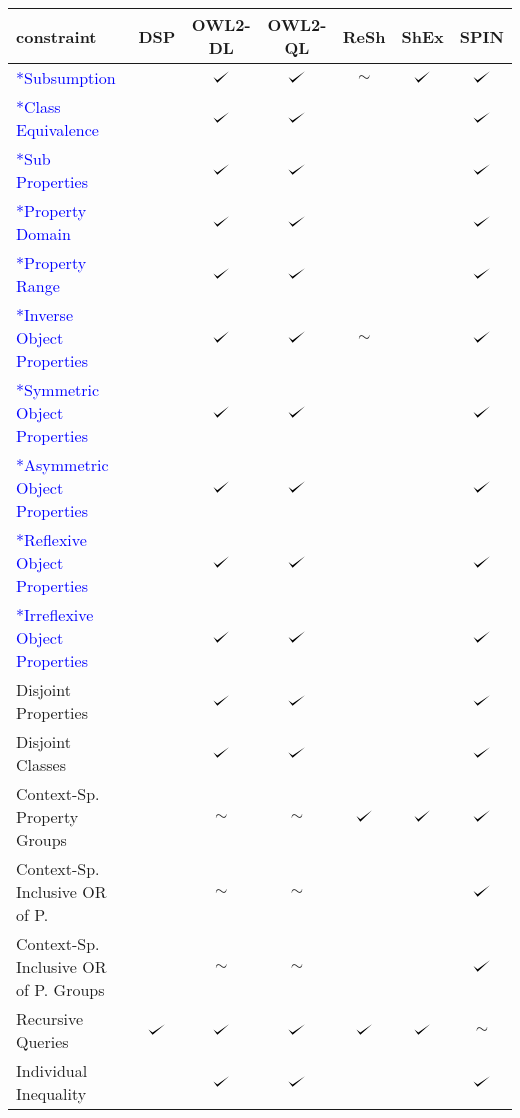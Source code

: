 \documentclass{llncs}
\def\checkmark{\tikz\fill[scale=0.4](0,.35) -- (.25,0) -- (1,.7) -- (.25,.15) -- cycle;}
\newenvironment{evaluation}{
  \scriptsize
  \sffamily
  \vspace{0.3cm}
  \begin{tabular}{l|c|c|c|c|c|c}
  \hline
  \textbf{constraint} & \textbf{DSP} & \textbf{OWL2-DL} & \textbf{OWL2-QL} & \textbf{ReSh} & \textbf{ShEx} & \textbf{SPIN} \\
  \hline

}{
  \hline
  \end{tabular}
  \linebreak
}
\begin{document}
\begin{evaluation}
\textcolor{blue}{*Subsumption} & \ding{55} & $\checkmark$ & $\checkmark$ & $\sim$ & $\checkmark$ & $\checkmark$ \\
\textcolor{blue}{*Class Equivalence} & \ding{55} & $\checkmark$ & $\checkmark$ & \ding{55} & \ding{55} & $\checkmark$ \\
\textcolor{blue}{*Sub Properties} & \ding{55} & $\checkmark$ & $\checkmark$ & \ding{55} & \ding{55} & $\checkmark$ \\
\textcolor{blue}{*Property Domain} & \ding{55} & $\checkmark$ & $\checkmark$ & \ding{55} & \ding{55} & $\checkmark$ \\
\textcolor{blue}{*Property Range} & \ding{55} & $\checkmark$ & $\checkmark$ & \ding{55} & \ding{55} & $\checkmark$ \\
\textcolor{blue}{*Inverse Object Properties} & \ding{55} & $\checkmark$ & $\checkmark$ & $\sim$ & \ding{55} & $\checkmark$ \\
\textcolor{blue}{*Symmetric Object Properties} & \ding{55} & $\checkmark$ & $\checkmark$ & \ding{55} & \ding{55} & $\checkmark$ \\
\textcolor{blue}{*Asymmetric Object Properties} & \ding{55} & $\checkmark$ & $\checkmark$ & \ding{55} & \ding{55} & $\checkmark$ \\
\textcolor{blue}{*Reflexive Object Properties} & \ding{55} & $\checkmark$ & $\checkmark$ & \ding{55} & \ding{55} & $\checkmark$ \\
\textcolor{blue}{*Irreflexive Object Properties} & \ding{55} & $\checkmark$ & $\checkmark$ & \ding{55} & \ding{55} & $\checkmark$ \\
Disjoint Properties & \ding{55} & $\checkmark$ & $\checkmark$ & \ding{55} & \ding{55} & $\checkmark$ \\
Disjoint Classes & \ding{55} & $\checkmark$ & $\checkmark$ & \ding{55} & \ding{55} & $\checkmark$ \\
Context-Sp. Property Groups & \ding{55} & $\sim$ & $\sim$ & $\checkmark$ & $\checkmark$ & $\checkmark$ \\
Context-Sp. Inclusive OR of P. & \ding{55} & $\sim$ & $\sim$ & & \ding{55} & $\checkmark$ \\
Context-Sp. Inclusive OR of P. Groups & \ding{55} & $\sim$ & $\sim$ & & \ding{55} & $\checkmark$ \\
Recursive Queries & $\checkmark$ & $\checkmark$ & $\checkmark$ & $\checkmark$ & $\checkmark$ & $\sim$ \\
Individual Inequality & \ding{55} & $\checkmark$ & $\checkmark$ & \ding{55} & \ding{55} & $\checkmark$ \\

\end{evaluation}
\end{document}

